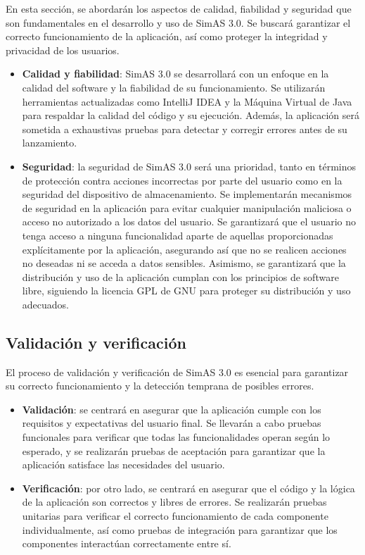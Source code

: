 En esta sección, se abordarán los aspectos de calidad, fiabilidad y seguridad que son fundamentales en el desarrollo y uso de SimAS 3.0. Se buscará garantizar el correcto funcionamiento de la aplicación, así como proteger la integridad y privacidad de los usuarios.

\begin{itemize}
    \item \textbf{Calidad y fiabilidad}: SimAS 3.0 se desarrollará con un enfoque en la calidad del software y la fiabilidad de su funcionamiento. Se utilizarán herramientas actualizadas como IntelliJ IDEA y la Máquina Virtual de Java para respaldar la calidad del código y su ejecución. Además, la aplicación será sometida a exhaustivas pruebas para detectar y corregir errores antes de su lanzamiento.
    
    \item \textbf{Seguridad}: la seguridad de SimAS 3.0 será una prioridad, tanto en términos de protección contra acciones incorrectas por parte del usuario como en la seguridad del dispositivo de almacenamiento. Se implementarán mecanismos de seguridad en la aplicación para evitar cualquier manipulación maliciosa o acceso no autorizado a los datos del usuario. Se garantizará que el usuario no tenga acceso a ninguna funcionalidad aparte de aquellas proporcionadas explícitamente por la aplicación, asegurando así que no se realicen acciones no deseadas ni se acceda a datos sensibles. Asimismo, se garantizará que la distribución y uso de la aplicación cumplan con los principios de software libre, siguiendo la licencia GPL de GNU para proteger su distribución y uso adecuados.
\end{itemize}


\subsection{Validación y verificación}

El proceso de validación y verificación de SimAS 3.0 es esencial para garantizar su correcto funcionamiento y la detección temprana de posibles errores.

\begin{itemize}
    \item \textbf{Validación}: se centrará en asegurar que la aplicación cumple con los requisitos y expectativas del usuario final. Se llevarán a cabo pruebas funcionales para verificar que todas las funcionalidades operan según lo esperado, y se realizarán pruebas de aceptación para garantizar que la aplicación satisface las necesidades del usuario.
    
    \item \textbf{Verificación}: por otro lado, se centrará en asegurar que el código y la lógica de la aplicación son correctos y libres de errores. Se realizarán pruebas unitarias para verificar el correcto funcionamiento de cada componente individualmente, así como pruebas de integración para garantizar que los componentes interactúan correctamente entre sí.
\end{itemize}


